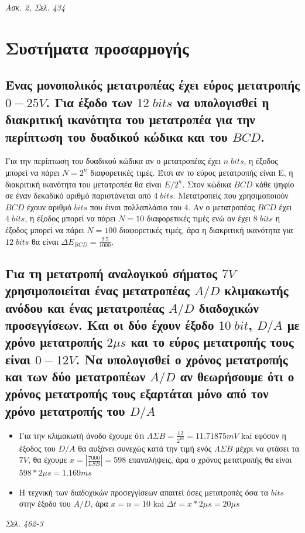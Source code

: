 \documentclass{article}
\begin{document}
\emph{Ασκ. 2, Σελ. 434}

\section{Συστήματα προσαρμογής}
\subsection{Ένας μονοπολικός μετατροπέας έχει εύρος μετατροπής $0-25V$. Για έξοδο των $12\; bits$ να υπολογισθεί η διακριτική ικανότητα του μετατροπέα για την περίπτωση 
του δυαδικού κώδικα και του $BCD$.}
Για την περίπτωση του δυαδικού κώδικα αν ο μετατροπέας έχει $n\; bits$, η έξοδος μπορεί να πάρει $Ν=2^n$ διαφορετικές τιμές. Έτσι αν το εύρος μετατροπής είναι Ε, η διακριτική
ικανότητα του μετατροπέα θα είναι $E/2^n$. Στον κώδικα $BCD$ κάθε ψηφίο σε έναν δεκαδικό αριθμό παριστάνεται από $4\; bits$. Μετατροπείς που χρησιμοποιούν $BCD$ 
έχουν αριθμό $bits$ που έιναι πολλαπλάσιο του 4. Αν ο μετατροπέας $BCD$ έχει $4\; bits$, η έξοδος μπορεί να πάρει $N=10$ διαφορετικές τιμές ενώ αν έχει $8\; bits$ η
έξοδος μπορεί να πάρει $Ν=100$ διαφορετικές τιμές, άρα η διακριτική ικανότητα για $12\; bits$ θα είναι $\Delta E_{BCD}=\frac{2.5}{1000}$.

\subsection{Για τη μετατροπή αναλογικού σήματος $7V$ χρησιμοποιείται ένας μετατροπέας $A/D$ κλιμακωτής ανόδου και ένας μετατροπέας $Α/D$ διαδοχικών προσεγγίσεων. Και οι δύο έχουν έξοδο 
$10\; bit$, $D/A$ με χρόνο μετατροπής $2\mu s$ και το εύρος μετατροπής τους είναι $0-12V$. Να υπολογισθεί ο χρόνος μετατροπής και των δύο μετατροπέων $A/D$ αν θεωρήσουμε ότι ο χρόνος
μετατροπής τους εξαρτάται μόνο από τον χρόνο μετατροπής του $D/A$}
    
\begin{itemize}
    \item Για την κλιμακωτή άνοδο έχουμε ότι $ΛΣΒ = \frac{12}{2^{10}} = 11.71875mV$ kai εφόσον η έξοδος του $D/A$ θα αυξάνει συνεχώς κατά την τιμή ενός $ΛΣΒ$ μέχρι να φτάσει τα $7V$, 
        θα έχουμε $x = |\frac{7000}{LSB}| = 598$ επαναλήψεις, άρα ο χρόνος μετατροπής θα είναι $598*2\mu s = 1.169ms$
    \item Η τεχνική των διαδοχικών προσεγγίσεων απαιτεί όσες μετατροπές όσα τα $bits$ στην έξοδο του $A/D$, άρα $x = n = 10$ kai $\Delta t = x * 2\mu s = 20\mu s$
\end{itemize}
\emph{Σελ. 462-3}
\end{document}
